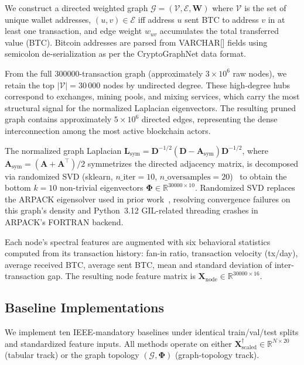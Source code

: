 We construct a directed weighted graph
$\mathcal{G} = (\mathcal{V}, \mathcal{E}, \mathbf{W})$
where $\mathcal{V}$ is the set of unique wallet addresses,
$(u, v) \in \mathcal{E}$ iff address $u$ sent BTC to address $v$ in at
least one transaction, and edge weight $w_{uv}$ accumulates the total
transferred value (BTC).
Bitcoin addresses are parsed from VARCHAR[] fields using semicolon
de-serialization as per the CryptoGraphNet data format.

From the full \num{300000}-transaction graph (approximately $3 \times 10^6$
raw nodes), we retain the top $|\mathcal{V}| = 30\,000$ nodes by
undirected degree.
These high-degree hubs correspond to exchanges, mining pools, and mixing
services, which carry the most structural signal for the normalized
Laplacian eigenvectors.
The resulting pruned graph contains approximately $5 \times 10^6$ directed
edges, representing the dense interconnection among the most active
blockchain actors.

The normalized graph Laplacian
$\mathbf{L}_{\text{sym}} = \mathbf{D}^{-1/2}(\mathbf{D} - \mathbf{A}_{\text{sym}})\mathbf{D}^{-1/2}$,
where $\mathbf{A}_{\text{sym}} = (\mathbf{A} + \mathbf{A}^\top)/2$
symmetrizes the directed adjacency matrix, is decomposed via randomized SVD
(sklearn, $n\_\text{iter}=10$, $n\_\text{oversamples}=20$)~\cite{Halko2011}
to obtain the bottom $k = 10$ non-trivial eigenvectors
$\boldsymbol{\Phi} \in \mathbb{R}^{30000 \times 10}$.
Randomized SVD replaces the ARPACK eigensolver used in prior
work~\cite{Kipf2016}, resolving convergence failures on this graph's
density and Python~3.12 GIL-related threading crashes in ARPACK's
FORTRAN backend.

Each node's spectral features are augmented with six behavioral statistics
computed from its transaction history:
fan-in ratio, transaction velocity (tx/day), average received BTC,
average sent BTC, mean and standard deviation of inter-transaction gap.
The resulting node feature matrix is
$\mathbf{X}_{\text{node}} \in \mathbb{R}^{30000 \times 16}$.


\subsection{Baseline Implementations}
\label{subsec:baselines}

We implement ten IEEE-mandatory baselines under identical train/val/test splits
and standardized feature inputs.
All methods operate on either $\mathbf{X}^{\dagger}_{\text{scaled}} \in
\mathbb{R}^{N \times 20}$ (tabular track) or the graph topology
$(\mathcal{G}, \boldsymbol{\Phi})$ (graph-topology track).

